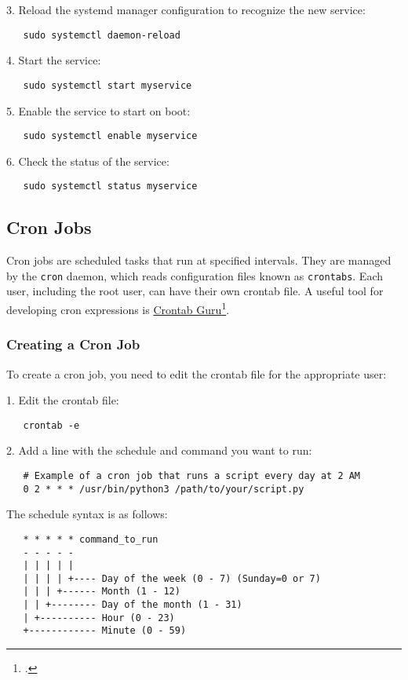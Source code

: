 3. Reload the systemd manager configuration to recognize the new service:
   \begin{verbatim}
   sudo systemctl daemon-reload
   \end{verbatim}

4. Start the service:
   \begin{verbatim}
   sudo systemctl start myservice
   \end{verbatim}

5. Enable the service to start on boot:
   \begin{verbatim}
   sudo systemctl enable myservice
   \end{verbatim}

6. Check the status of the service:
   \begin{verbatim}
   sudo systemctl status myservice
   \end{verbatim}
\newpage
\subsection{Cron Jobs}
Cron jobs are scheduled tasks that run at specified intervals. They are managed by the \texttt{cron} daemon, which reads configuration files known as \texttt{crontabs}. Each user, including the root user, can have their own crontab file.
A useful tool for developing cron expressions is \href{https://crontab.guru/}{Crontab Guru}\footcite{site:crontab-guru}.

\subsubsection{Creating a Cron Job}
To create a cron job, you need to edit the crontab file for the appropriate user:

1. Edit the crontab file:
   \begin{verbatim}
   crontab -e
   \end{verbatim}

2. Add a line with the schedule and command you want to run:
   \begin{verbatim}
   # Example of a cron job that runs a script every day at 2 AM
   0 2 * * * /usr/bin/python3 /path/to/your/script.py
   \end{verbatim}

   The schedule syntax is as follows:
   \begin{verbatim}
   * * * * * command_to_run
   - - - - -
   | | | | |
   | | | | +---- Day of the week (0 - 7) (Sunday=0 or 7)
   | | | +------ Month (1 - 12)
   | | +-------- Day of the month (1 - 31)
   | +---------- Hour (0 - 23)
   +------------ Minute (0 - 59)
   \end{verbatim}

